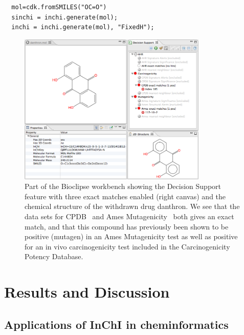 \documentclass[10pt]{bmc_article}
\newenvironment{bmcformat}{\fussy\setboolean{publ}{true}}{\fussy}
\begin{document}
\begin{bmcformat}
\begin{verbatim}
  mol=cdk.fromSMILES("OC=O")
  sinchi = inchi.generate(mol);
  inchi = inchi.generate(mol), "FixedH");
\end{verbatim}


\begin{figure}[!hb]
\begin{center}
	\includegraphics[width=9cm]{danthron-ds.png}

\caption{Part of the Bioclipse workbench showing the Decision Support feature with three exact matches enabled (right canvas) and the chemical structure of the withdrawn drug danthron. We see that the data sets for CPDB~\cite{Fitzpatrick:2008dp} and Ames Mutagenicity~\cite{Kazius:2005pv} both gives an exact match, and that this compound has previously been shown to be positive (mutagen) in an Ames Mutagenicity test as well as positive for an in vivo carcinogenicity test included in the Carcinogenicity Potency Database.}
\label{fig:danth-ds}
\end{center}
\end{figure}

	



\section*{Results and Discussion}

\subsection*{Applications of InChI in cheminformatics}




\end{bmcformat}
\end{document}
